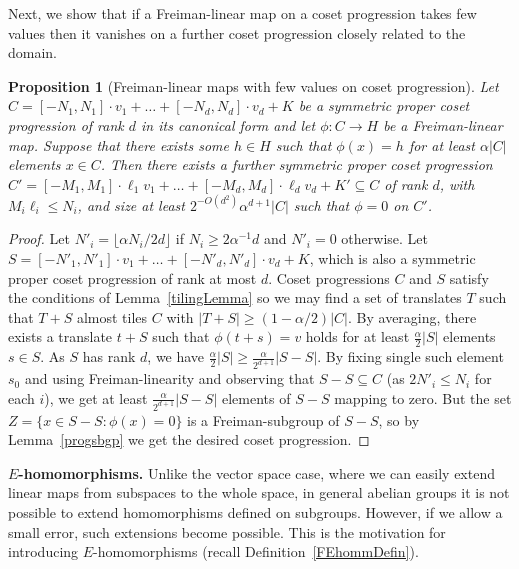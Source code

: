 \documentclass[a4paper,11pt]{article}
\numberwithin{theorem}{section}
\newtheorem{proposition}[theorem]{Proposition}
\theoremstyle{definition}
\begin{document}
Next, we show that if a Freiman-linear map on a coset progression takes few values then it vanishes on a further coset progression closely related to the domain.

\begin{proposition}[Freiman-linear maps with few values on coset progression]\label{fewvalsCPFLin}
    Let $C = [-N_1, N_1] \cdot v_1 + \dots + [-N_d, N_d] \cdot v_d + K$ be a symmetric proper coset progression of rank $d$ in its canonical form and let $\phi : C \to H$ be a Freiman-linear map. Suppose that there exists some $h \in H$ such that $\phi(x) = h$ for at least $\alpha |C|$ elements $x \in C$. Then there exists a further symmetric proper coset progression $C' = [-M_1, M_1] \cdot \ell_1 v_1 + \dots + [-M_d, M_d] \cdot \ell_d v_d + K' \subseteq C$ of rank $d$, with $M_i \ell_i \leq N_i$, and size at least $2^{-O(d^2)}\alpha^{d + 1}|C|$ such that $\phi = 0$ on $C'$.
\end{proposition}

\begin{proof}
   Let $N'_i = \lfloor \alpha N_i /2d \rfloor$ if $N_i \geq 2\alpha^{-1} d$ and $N'_i = 0$ otherwise. Let $S = [-N'_1, N'_1] \cdot v_1 + \dots + [-N'_d, N'_d] \cdot v_d + K$, which is also a symmetric proper coset progression of rank at most $d$. Coset progressions $C$ and $S$ satisfy the conditions of Lemma~\ref{tilingLemma} so we may find a set of translates $T$ such that $T + S$ almost tiles $C$ with $|T+ S| \geq (1-\alpha/2)|C|$. By averaging, there exists a translate $t +S $ such that $\phi(t + s) = v$ holds for at least $\frac{\alpha}{2}|S|$ elements $s \in S$. As $S$ has rank $d$, we have $\frac{\alpha}{2}|S| \geq \frac{\alpha}{2^{d + 1}}|S - S|$. By fixing single such element $s_0$ and using Freiman-linearity and observing that $S - S \subseteq C$ (as $2N'_i \leq N_i$ for each $i$), we get at least $\frac{\alpha}{2^{d + 1}}|S - S|$ elements of $S-S$ mapping to zero. But the set $Z = \{x \in S-S: \phi(x) = 0\}$ is a Freiman-subgroup of $S - S$, so by Lemma~\ref{progsbgp} we get the desired coset progression.
 \end{proof}



\hspace{\baselineskip}

\noindent \textbf{$E$-homomorphisms.} Unlike the vector space case, where we can easily extend linear maps from subspaces to the whole space, in general abelian groups it is not possible to extend homomorphisms defined on subgroups. However, if we allow a small error, such extensions become possible. This is the motivation for introducing $E$-homomorphisms (recall Definition~\ref{FEhommDefin}).
\end{document}
